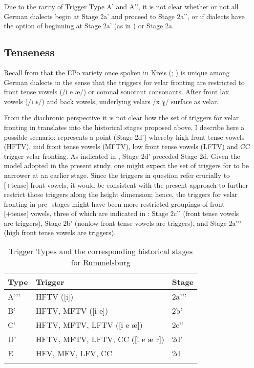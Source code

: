Due to the rarity of Trigger Type A' and A'{}', it is not clear whether or not all German dialects begin at Stage 2a' and proceed to Stage 2a'{}', or if dialects have the option of beginning at Stage 2a' (as in ) or Stage 2a.

\subsection{Tenseness}\label{sec:12.6.2}\largerpage[2]

Recall from  that the EPo variety once spoken in Kreis  (\citealt{Mischke1936}; ) is unique among German dialects in the sense that the triggers for velar fronting are restricted to front tense vowels (/i e æ/) or coronal sonorant consonants. After front lax vowels (/ɪ ɛ/) and back vowels, underlying velars /x ɣ/ surface as velar.

From the diachronic perspective it is not clear how the set of triggers for velar fronting in  translates into the historical stages proposed above. I describe here a possible scenario:  represents a point (Stage 2d') whereby high front tense vowels (HFTV), mid front tense vowels (MFTV), low front tense vowels (LFTV) and CC trigger velar fronting. As indicated in , Stage 2d' preceded Stage 2d. Given the  model adopted in the present study, one might expect the set of triggers for  to be narrower at an earlier stage. Since the triggers in question refer crucially to [+tense] front vowels, it would be consistent with the present approach to further restrict those triggers along the height dimension; hence, the triggers for velar fronting in pre- stages might have been more restricted groupings of front [+tense] vowels, three of which are indicated in : Stage 2c'{}' (front tense vowels are triggers), Stage 2b' (nonlow front tense vowels are triggers), and Stage 2a'{}'{}' (high front tense vowels are triggers).

\begin{table}
\caption{Trigger Types and the corresponding historical stages for Rummelsburg\label{tab:12.29}}
\begin{tabular}{lll}
\lsptoprule
Type & Trigger & Stage\\\midrule
A'{}'{}' & HFTV ([i]) & 2a'{}'{}'\\
B' & HFTV, MFTV ([i e]) & 2b'\\
C' & HFTV, MFTV, LFTV ([i e æ]) & 2c'{}'\\
D' & HFTV, MFTV, LFTV, CC ([i e æ r]) & 2d'\\
E & HFV, MFV, LFV, CC & 2d\\
\lspbottomrule
\end{tabular}
\end{table}


